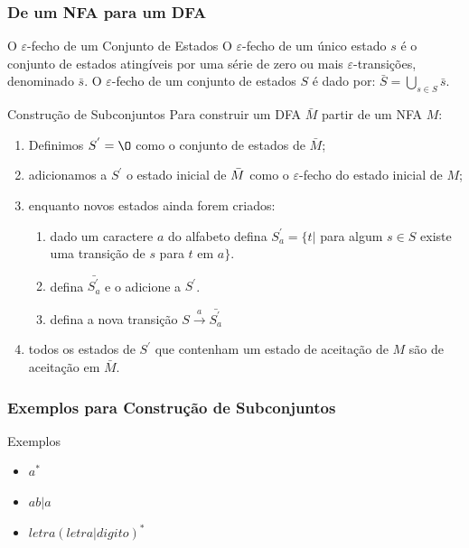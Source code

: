 \documentclass[table]{beamer}
\begin{document}
\begin{frame}
   \frametitle{De um NFA para um DFA}
   \begin{block}{O $\varepsilon$-fecho de um Conjunto de Estados}
   O $\varepsilon$-fecho de um único estado $s$ é o conjunto de estados atingíveis por uma série de zero ou mais $\varepsilon$-transições, denominado $\bar{s}$. O $\varepsilon$-fecho de um conjunto de estados $S$ é dado por: $\bar{S} = \bigcup\limits_{s \in S}\bar{s}$. 
   \end{block}
   \begin{block}{Construção de Subconjuntos}
   \footnotesize
   Para construir um DFA $\bar{M}$ partir de um NFA $M$:
      \begin{enumerate}
         \item Definimos $S^{'} = \O$ como o conjunto de estados de $\bar{M}$;
         \item adicionamos a $S^{'}$ o estado inicial de $\Bar{M}$ como o $\varepsilon$-fecho do estado inicial de $M$;
	 \item enquanto novos estados ainda forem criados:
	 \begin{enumerate}
	    \item dado um caractere $a$ do alfabeto defina $S^{'}_{a} = \{t|$ para algum $s \in S$ existe uma transição de $s$ para $t$ em $a\}$. 
	    \item defina $\bar{S^{'}_{a}}$ e o adicione a $S^{'}$.
	    \item defina a nova transição $S \xrightarrow{a} \bar{S^{'}_{a}}$ 
	 \end{enumerate}
	 \item todos os estados de $S^{'}$ que contenham um estado de aceitação de $M$ são de aceitação em $\bar{M}$.
      \end{enumerate}
   \end{block}
\end{frame}

\begin{frame}
   \frametitle{Exemplos para Construção de Subconjuntos}
   \begin{block}{Exemplos}
      \begin{itemize}
         \item $a^{*}$
	 \item $ab|a$
	 \item $letra(letra|digito)^{*}$
      \end{itemize}
   \end{block}
\end{frame}
\end{document}

